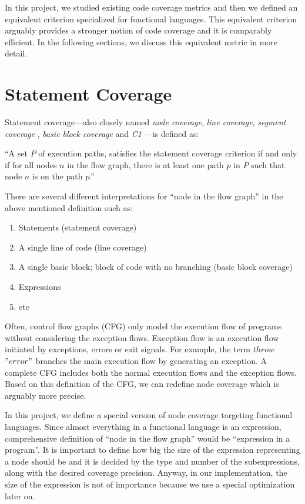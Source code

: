 \documentclass[12pt,a4paper]{report}
\begin{document}
In this project, we studied existing code coverage metrics and then we defined an equivalent criterion specialized for functional languages. This equivalent criterion arguably provides a stronger notion of code coverage and it is comparably efficient. In the following sections, we discuss this equivalent metric in more detail.

\section{Statement Coverage}
Statement coverage---also closely named \emph{node coverage}, \emph{line coverage}, \emph{segment coverage} \cite{Ntafos:1988:CST:630792.631017}, \emph{basic block coverage} and \emph{C1} \cite{beizer2002software}---is defined as: 

``A set $P$ of execution paths, satisfies the statement coverage criterion if and only if for all nodes $n$ in the flow graph, there is at least one path $p$ in $P$ such that node $n$ is on the path $p$.''\cite{Zhu:1997:SUT:267580.267590}

There are several different interpretations for ``node in the flow graph'' in the above mentioned definition such as:

\begin{enumerate}
 \item Statements (statement coverage)
 \item A single line of code (line coverage)
 \item A single basic block; block of code with no branching (basic block coverage)
 \item Expressions 
 \item etc
\end{enumerate}

Often, control flow graphs (CFG) only model the execution flow of programs without considering the exception flows. Exception flow is an execution flow initiated by exceptions, errors or exit signals. For example, the term $throw$ $"error"$  branches the main execution flow by generating an exception. A complete CFG includes both the normal execution flows and the exception flows. Based on this definition of the CFG, we can redefine node coverage which is arguably more precise.

In this project, we define a special version of node coverage targeting functional languages. Since almost everything in a functional language is an expression, comprehensive definition of ``node in the flow graph'' would be ``expression in a program''. It is important to define how big the size of the expression representing a node should be and it is decided by the type and number of the subexpressions, along with the desired coverage precision. Anyway, in our implementation, the size of the expression is not of importance because we use a special optimization later on.   
\end{document}
